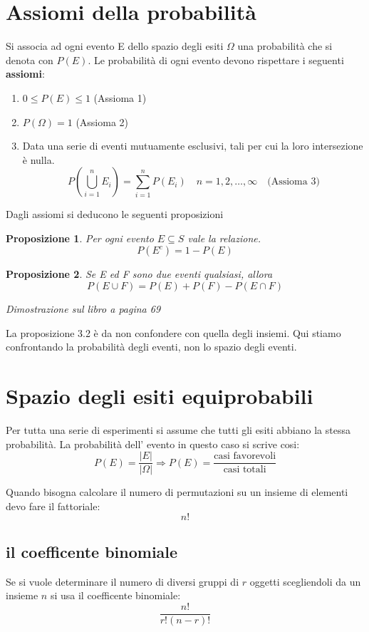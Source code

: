 \documentclass[12pt]{article}
\newtheorem{proposition}{Proposizione}[section]
\begin{document}
\newpage
\section{Assiomi della probabilità}

Si associa ad ogni evento E dello spazio degli esiti \(\Omega\)
una probabilità che si denota con \(P(E)\). Le probabilità di ogni evento
devono rispettare i seguenti {\bf{assiomi}}:
\begin{enumerate}
    \item \(0 \le P(E) \le 1\) \quad (Assioma 1)
    \item \(P(\Omega) = 1\) \quad (Assioma 2)
    \item Data una serie di eventi mutuamente esclusivi, tali per cui 
    la loro intersezione è nulla. 
    \[
    P (\bigcup_{i = 1} ^n E_i) = \sum_{i=1}^n P(E_i) \quad n= 1,2,\dots,\infty \quad \text{(Assioma 3)}   
    \]
\end{enumerate}

Dagli assiomi si deducono le seguenti proposizioni

\begin{proposition}
    Per ogni evento \(E \subseteq S\) vale la relazione.
    \[P(E^c) = 1-P(E)\] 
\end{proposition}

\begin{proposition}
Se E ed F sono due eventi qualsiasi, allora
\[
P(E \cup F) = P(E) + P(F) - P(E \cap F)    
\]

Dimostrazione sul libro a pagina 69
\end{proposition}

La proposizione 3.2 è da non confondere con quella degli insiemi. 
Qui stiamo confrontando la probabilità degli eventi, non lo spazio degli
eventi. 

\section{Spazio degli esiti equiprobabili}

Per tutta una serie di esperimenti si assume che tutti gli esiti
abbiano la stessa probabilità. 
La probabilità dell' evento in questo caso si scrive cosi: 
\[
P(E) = \frac{|E|}{|\Omega|} \Longrightarrow P(E) = \frac{\text{casi favorevoli}}{\text{casi totali}}   
\]

Quando bisogna calcolare il numero di permutazioni su un insieme di elementi
devo fare il fattoriale: 
\[
n!    
\]

\subsection{il coefficente binomiale}
Se si vuole determinare il numero di diversi gruppi di \(r\) oggetti scegliendoli
da un insieme \(n\) si usa il coefficente binomiale:
\[
\frac{n!}{r!(n-r)!}    
\]
\end{document}
